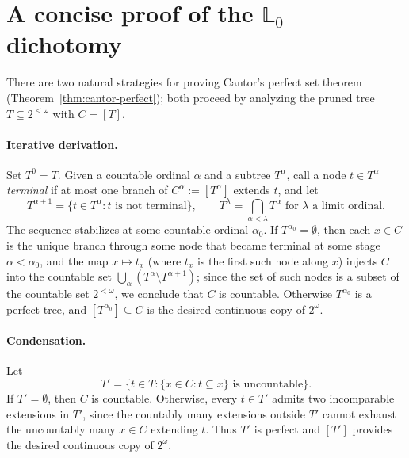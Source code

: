 
\section{A concise proof of the \texorpdfstring{$\mathbb{L}_0$}{L0} dichotomy}\label{sec:concise_L0}

There are two natural strategies for proving Cantor's perfect set theorem (Theorem~\ref{thm:cantor-perfect}); both proceed by analyzing the pruned tree $T \subseteq 2^{<\omega}$ with $C = [T]$.

\paragraph{Iterative derivation.}
Set $T^0 = T$.
Given a countable ordinal $\alpha$ and a subtree $T^\alpha$, call a node $t \in T^\alpha$ \emph{terminal} if at most one branch of $C^\alpha := [T^\alpha]$ extends $t$, and let $$T^{\alpha+1} = \{t \in T^\alpha : t \text{ is not terminal}\}, \qquad T^\lambda = \bigcap_{\alpha < \lambda} T^\alpha \text{ for } \lambda \text{ a limit ordinal.}$$
The sequence stabilizes at some countable ordinal $\alpha_0$.
If $T^{\alpha_0} = \emptyset$, then each $x \in C$ is the unique branch through some node that became terminal at some stage $\alpha < \alpha_0$, and the map $x\mapsto t_x$ (where $t_x$ is the first such node along $x$) injects $C$ into the countable set $\bigcup_\alpha(T^\alpha\setminus T^{\alpha+1})$; since the set of such nodes is a subset of the countable set $2^{<\omega}$, we conclude that $C$ is countable.
Otherwise $T^{\alpha_0}$ is a perfect tree, and $[T^{\alpha_0}] \subseteq C$ is the desired continuous copy of $2^\omega$.

\paragraph{Condensation.}
Let $$T' = \{t \in T : \{x \in C : t \subseteq x\} \text{ is uncountable}\}.$$
If $T' = \emptyset$, then $C$ is countable.
Otherwise, every $t \in T'$ admits two incomparable extensions in $T'$, since the countably many extensions outside $T'$ cannot exhaust the uncountably many $x \in C$ extending $t$.
Thus $T'$ is perfect and $[T']$ provides the desired continuous copy of $2^\omega$.

